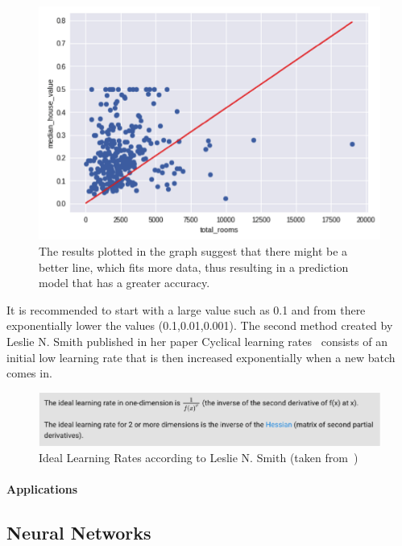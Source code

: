 \begin{figure}[htbp]
  \centering
  \includegraphics[width=\textwidth]{images/linearGraph}
  \caption{ The results plotted in the graph suggest that there might be a better line, which fits more data, thus resulting in a prediction model that has a greater accuracy.}
  \label{fig:linearGraph}
\end{figure}


It is recommended to start with a large value such as 0.1 and from there exponentially lower the values (0.1,0.01,0.001).
The second method created by Leslie N. Smith published in her paper Cyclical learning rates~\cite{leslie15} consists of an initial low learning rate that is then increased exponentially when a new batch comes in.

\begin{figure}[htbp]
  \centering
  \includegraphics[width=\textwidth]{images/learningRate}
  \caption{ Ideal Learning Rates according to Leslie N. Smith (taken from~\cite{leslie15}) }
  \label{fig:learningRate}
\end{figure}


\paragraph{Applications}





\subsection{Neural Networks}

